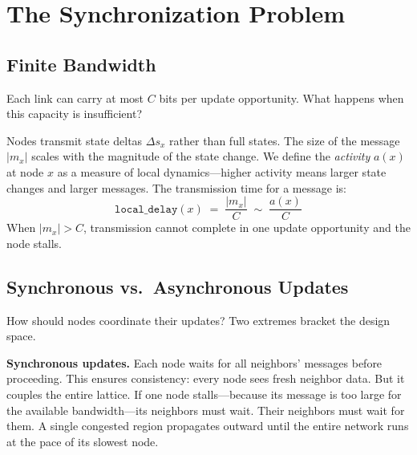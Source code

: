 \documentclass[aps, pra, reprint, superscriptaddress, nofootinbib, singlespacing]{revtex4-2}
\begin{document}
\section{The Synchronization Problem}
\label{sec:sync}

\subsection{Finite Bandwidth}
\label{subsec:finite_bandwidth}

Each link can carry at most $C$ bits per update opportunity. What happens when this capacity is insufficient?

Nodes transmit state deltas $\Delta s_x$ rather than full states. The size of the message $|m_x|$ scales with the magnitude of the state change. We define the \emph{activity} $a(x)$ at node $x$ as a measure of local dynamics—higher activity means larger state changes and larger messages. The transmission time for a message is:
\begin{equation}
    \texttt{local\_delay}(x) \;=\; \frac{|m_x|}{C} \;\sim\; \frac{a(x)}{C}
    \label{eq:local-delay}
\end{equation}
When $|m_x| > C$, transmission cannot complete in one update opportunity and the node stalls.

\subsection{Synchronous vs.\ Asynchronous Updates}
\label{subsec:sync_async}

How should nodes coordinate their updates? Two extremes bracket the design space.

\textbf{Synchronous updates.} Each node waits for all neighbors' messages before proceeding. This ensures consistency: every node sees fresh neighbor data. But it couples the entire lattice. If one node stalls—because its message is too large for the available bandwidth—its neighbors must wait. Their neighbors must wait for them. A single congested region propagates outward until the entire network runs at the pace of its slowest node.
\end{document}
